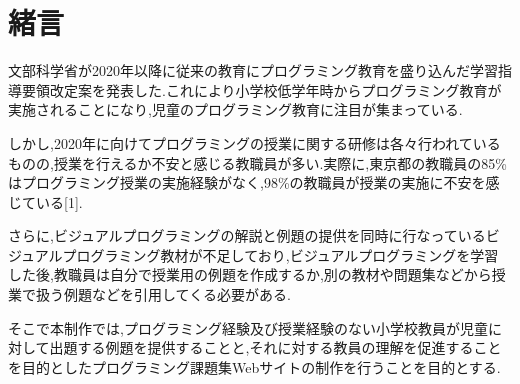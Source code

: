 \newpage

\section{\rm 緒言}
文部科学省が2020年以降に従来の教育にプログラミング教育を盛り込んだ学習指導要領改定案を発表した.これにより小学校低学年時からプログラミング教育が実施されることになり,児童のプログラミング教育に注目が集まっている.

しかし,2020年に向けてプログラミングの授業に関する研修は各々行われているものの,授業を行えるか不安と感じる教職員が多い.実際に,東京都の教職員の85\%はプログラミング授業の実施経験がなく,98\%の教職員が授業の実施に不安を感じている[1].

さらに,ビジュアルプログラミングの解説と例題の提供を同時に行なっているビジュアルプログラミング教材が不足しており,ビジュアルプログラミングを学習した後,教職員は自分で授業用の例題を作成するか,別の教材や問題集などから授業で扱う例題などを引用してくる必要がある.

そこで本制作では,プログラミング経験及び授業経験のない小学校教員が児童に対して出題する例題を提供することと,それに対する教員の理解を促進することを目的としたプログラミング課題集Webサイトの制作を行うことを目的とする.